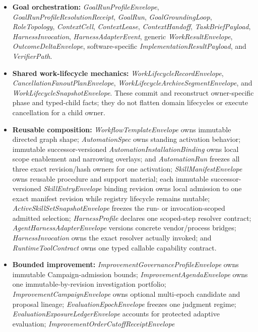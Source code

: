 \documentclass[
  11pt,
]{article}
\providecommand{\tightlist}{%
  \setlength{\itemsep}{0pt}\setlength{\parskip}{0pt}}
\begin{document}
\begin{itemize}
\tightlist
\item
  \textbf{Goal orchestration:} \emph{GoalRunProfileEnvelope},
  \emph{GoalRunProfileResolutionReceipt}, \emph{GoalRun},
  \emph{GoalGroundingLoop}, \emph{RoleTopology}, \emph{ContextCell},
  \emph{ContextLease}, \emph{ContextHandoff},
  \emph{TaskBriefPayload}, \emph{HarnessInvocation},
  \emph{HarnessAdapterEvent}, generic \emph{WorkResultEnvelope},
  \emph{OutcomeDeltaEnvelope}, software-specific
  \emph{ImplementationResultPayload}, and \emph{VerifierPath}.
\item
  \textbf{Shared work-lifecycle mechanics:}
  \emph{WorkLifecycleRecordEnvelope},
  \emph{CancellationFanoutPlanEnvelope},
  \emph{WorkLifecycleArchiveSegmentEnvelope}, and
  \emph{WorkLifecycleSnapshotEnvelope}. These commit and reconstruct
  owner-specific phase and typed-child facts; they do not flatten domain
  lifecycles or execute cancellation for a child owner.
\item
  \textbf{Reusable composition:} \emph{WorkflowTemplateEnvelope} owns
  immutable directed graph shape; \emph{AutomationSpec} owns standing
  activation behavior; immutable successor-versioned
  \emph{AutomationInstallationBinding} owns local scope enablement and
  narrowing overlays; and \emph{AutomationRun} freezes all three exact
  revision/hash owners for one activation;
  \emph{SkillManifestEnvelope} owns reusable procedure and support material;
  each immutable successor-versioned \emph{SkillEntryEnvelope} binding revision
  owns local admission to one exact manifest revision while registry lifecycle
  remains mutable;
  \emph{ActiveSkillSetSnapshotEnvelope} freezes the run- or invocation-scoped
  admitted selection; \emph{HarnessProfile} declares one scoped-step resolver
  contract; \emph{AgentHarnessAdapterEnvelope} versions concrete vendor/process
  bridges; \emph{HarnessInvocation} owns the exact resolver actually invoked; and
  \emph{RuntimeToolContract} owns one typed callable capability contract.
\item
  \textbf{Bounded improvement:}
  \emph{ImprovementGovernanceProfileEnvelope} owns immutable Campaign-admission
  bounds; \emph{ImprovementAgendaEnvelope} owns one immutable-by-revision
  investigation portfolio; \emph{ImprovementCampaignEnvelope} owns optional multi-epoch
  candidate and proposal lineage; \emph{EvaluationEpochEnvelope} freezes one
  judgment regime; \emph{EvaluationExposureLedgerEnvelope} accounts for
  protected adaptive evaluation; \emph{ImprovementOrderCutoffReceiptEnvelope}

\end{itemize}
\end{document}
